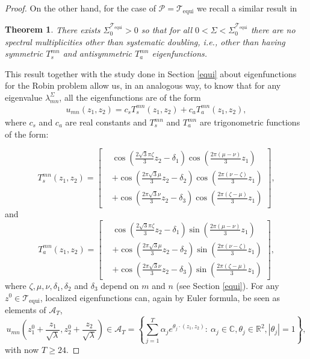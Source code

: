 \documentclass{amsart}
\newtheorem{theorem}{Theorem}[section]
\theoremstyle{definition}
\theoremstyle{remark}
\renewcommand\geq\geqslant
\numberwithin{equation}{section}
\theoremstyle{definition}
\theoremstyle{remark}
\begin{document}
\begin{proof}
	On the other hand, for the case of $\mathcal{P}=\mathcal{T}_{\mathrm{equi}}$ we recall a similar result in \cite[Theorem 1.5]{RudWig2}
	\begin{theorem}
		There exists $\Sigma_0^{\mathcal{T}_{\mathrm{equi}}}>0$ so that for all $0<\Sigma<\Sigma_0^{\mathcal{T}_{\mathrm{equi}}}$ there are no spectral multiplicities other than systematic doubling, i.e., other than having symmetric $T_s^{mn}$ and antisymmetric $T_a^{mn}$  eigenfunctions.
	\end{theorem}
	This result together with the study done in Section \ref{equi} about eigenfunctions for the Robin problem allow us, in an analogous way, to know that for any eigenvalue $\lambda_{mn}^\Sigma$, all the eigenfunctions are of the form
	\begin{equation}
		\begin{aligned}
			u_{mn}(z_1,z_2)=c_sT_s^{mn}(z_1,z_2)+c_aT_a^{mn}(z_1,z_2),
		\end{aligned}
	\end{equation}where $c_s$ and $c_a$ are real constants and $T_s^{mn}$ and $T_a^{mn}$ are trigonometric functions of the form:
	
	\begin{equation}
			T_s^{mn}(z_1,z_2)=\left[\begin{aligned}
				& \cos \left(\frac{2\sqrt{3}\pi \zeta}{3}z_2-\delta_1\right) \cos \left(\frac{2\pi(\mu-\nu)}{3}z_1\right) \\
				& +\cos \left(\frac{2\pi\sqrt{3} \mu}{3 }z_2-\delta_2\right) \cos \left(\frac{2\pi(\nu-\zeta)}{3}z_1\right) \\
				& +\cos \left(\frac{2\pi\sqrt{3} \nu}{3}z_2-\delta_3\right) \cos \left(\frac{2\pi(\zeta-\mu)}{3}z_1\right)
			\end{aligned}\right],\end{equation}and\begin{equation}
		T_a^{mn}(z_1,z_2)=\left[\begin{aligned}
				& \cos \left(\frac{2\sqrt{3}\pi \zeta}{3}z_2-\delta_1\right)  \sin \left(\frac{2\pi(\mu-\nu)}{3}z_1\right) \\
				& +\cos \left(\frac{2\pi\sqrt{3} \mu}{3 }z_2-\delta_2\right) \sin \left(\frac{2\pi(\nu-\zeta)}{3}z_1\right) \\
				& +\cos \left(\frac{2\pi\sqrt{3} \nu}{3}z_2-\delta_3\right) \sin \left(\frac{2\pi(\zeta-\mu)}{3}z_1\right)
			\end{aligned}\right],
	\end{equation}where $\zeta,\mu,\nu,\delta_1,\delta_2$ and $\delta_3$ depend on $m$ and $n$ (see Section \ref{equi}).
	For any $z^0\in\mathcal{T}_{\mathrm{equi}}$, localized eigenfunctions can, again by Euler formula, be seen as elements of $\mathcal{A}_T$, 
	\begin{equation}
		u_{mn}\left(z_1^0+\frac{z_1}{\sqrt{\lambda}},z_2^0+\frac{z_2}{\sqrt{\lambda}}\right)\in	\mathcal{A}_T=\left\{\sum_{j=1}^{T}\alpha_je^{\theta_j\cdot(z_1,z_2)}:\ \alpha_j\in\mathbb{C}, \theta_j\in\mathbb{R}^2,|\theta_j|=1\right\},
	\end{equation}with now $T\geq 24$.
	

\end{proof}
\end{document}
